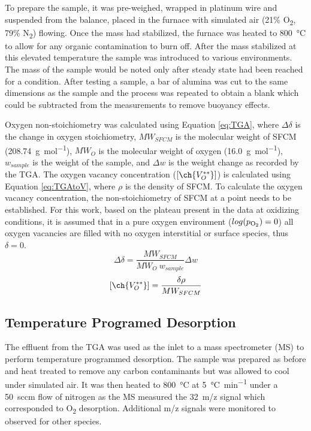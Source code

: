         To prepare the sample, it was pre-weighed, wrapped in platinum wire and suspended from the balance, placed in the furnace with simulated air (21\% O\textsubscript{2}, 79\% N\textsubscript{2}) flowing.
        Once the mass had stabilized, the furnace was heated to \SI{800}{\celsius} to allow for any organic contamination to burn off.
        After the mass stabilized at this elevated temperature the sample was introduced to various environments.
        The mass of the sample would be noted only after steady state had been reached for a condition.
        After testing a sample, a bar of alumina was cut to the same dimensions as the sample and the process was repeated to obtain a blank which could be subtracted from the measurements to remove buoyancy effects.

        Oxygen non-stoichiometry was calculated using Equation \ref{eq:TGA}, where $\Delta\delta$ is the change in oxygen stoichiometry, $MW_{SFCM}$ is the molecular weight of SFCM (\SI{208.74}{\gram\per\mol}), $MW_O$ is the molecular weight of oxygen (\SI{16.0}{\gram\per\mol}), $w_{sample}$ is the weight of the sample, and $\Delta{}w$ is the weight change as recorded by the TGA.
        The oxygen vacancy concentration ($\lbrack\ch{V_O^{**}}\rbrack$) is calculated using Equation \ref{eq:TGAtoV}, where $\rho$ is the density of SFCM.
        To calculate the oxygen vacancy concentration, the non-stoichiometry of SFCM at a point needs to be established.
        For this work, based on the plateau present in the data at oxidizing conditions, it is assumed that in a pure oxygen environment ($log(p\textsubscript{O\textsubscript{2}})=0$) all oxygen vacancies are filled with no oxygen interstitial or surface species, thus $\delta=0$.
        \begin{equation}
            \Delta\delta = \frac{MW_{SFCM}}{MW_O\ w_{sample}}\Delta{}w
            \label{eq:TGA}
        \end{equation}
        \begin{equation}
            \lbrack\ch{V_O^{**}}\rbrack =\frac{\delta\rho}{MW_{SFCM}}
            \label{eq:TGAtoV}
        \end{equation}

    \subsection{Temperature Programed Desorption}
        The effluent from the TGA was used as the inlet to a mass spectrometer (MS) to perform temperature programmed desorption.
        The sample was prepared as before and heat treated to remove any carbon contaminants but was allowed to cool under simulated air.
        It was then heated to \SI{800}{\celsius} at \SI{5}{\celsius\per\minute} under a \SI{50}{sccm} flow of nitrogen as the MS measured the \SI{32}{m/z} signal which corresponded to O\textsubscript{2} desorption.
        Additional m/z signals were monitored to observed for other species.

